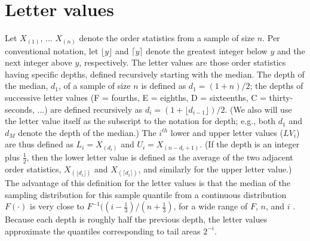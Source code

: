 \documentclass[oneside]{article}
\begin{document}
\section{Letter values}
\label{sec:letter-values}

Let $X_{(1)}$, ... $X_{(n)}$ denote the order statistics from a sample of size $n$. Per conventional notation, let $\lfloor y \rfloor$ and $\lceil y \rceil$ denote the greatest integer below $y$ and the next integer above $y$, respectively. The letter values are those order statistics having specific depths, defined recursively starting with the median. The depth of the median, $d_1$, of a sample of size $n$ is defined as $d_1 = (1 + n )/2$; the depths of successive letter values (F = fourths, E = eighths, D = sixteenths, C = thirty-seconds, ...) are defined recursively as $d_i = (1 + \lfloor d_{i-1} \rfloor)/2$. (We also will use the letter value itself as the subscript to the notation for depth; e.g., both $d_1$ and $d_M$ denote the depth of the median.) The $i^{th}$ lower and upper letter values ($LV_i$) are thus defined as $L_i = X_{(d_i)}$ and $U_i = X_{(n - d_i + 1)}$. (If the depth is an integer plus $\frac{1}{2}$, then the lower letter value is defined as the average of the two adjacent order statistics, $X_{(\lfloor d_i \rfloor)}$ and $X_{(\lceil d_i \rceil)}$, and similarly for the upper letter value.) The advantage of this definition for the letter values is that the median of the sampling distribution for this sample quantile from a continuous distribution $F(\cdot)$ is very close to $F^{-1} ((i - \frac{1}{3})/(n + \frac{1}{3})$, for a wide range of $F$, $n$, and $i$ \citep{dchlv}. Because each depth is roughly half the previous depth, the letter values approximate the quantiles corresponding to tail areas $2^{-i}$.
\end{document}
